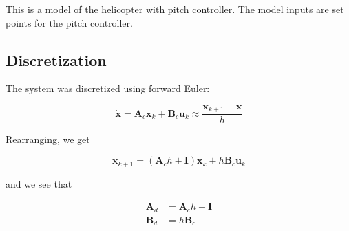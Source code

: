 This is a model of the helicopter with pitch controller. The model inputs are set points for the pitch controller.



\subsection{Discretization}

The system was discretized using forward Euler:

\begin{equation}

    \mathbf{\dot{x}} = \mathbf{A}_c\mathbf{x}_k + \mathbf{B}_c\mathbf{u}_k \approx \frac{\mathbf{x}_{k+1}-\mathbf{x}}{h}

\end{equation}



Rearranging, we get

\begin{equation}

    \mathbf{x}_{k+1} = (\mathbf{A}_ch + \mathbf{I})\mathbf{x}_k + h\mathbf{B}_c\mathbf{u}_k

\end{equation}



and we see that

\begin{subequations}

    \begin{align}

        \mathbf{A}_d &= \mathbf{A}_ch+\mathbf{I} \\

        \mathbf{B}_d &= h\mathbf{B}_c

    \end{align}

    \label{eq:eulerfwd}

\end{subequations}



